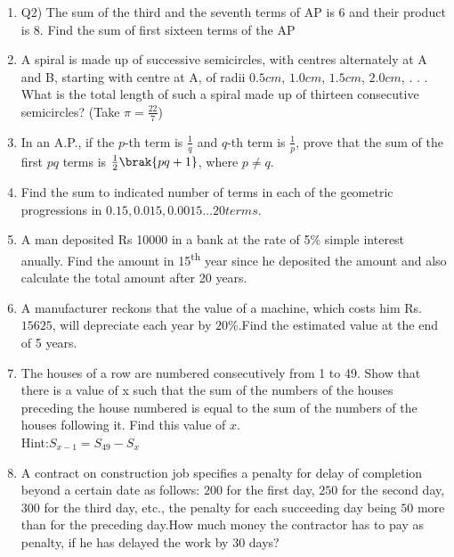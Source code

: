 \begin{enumerate}[label=\thechapter.\arabic*,ref=\thechapter.\theenumi]
\item Q2) The sum of the third and the seventh terms of AP is 6 and their product is 8. Find the sum of first sixteen terms of the AP \\
\solution 
\pagebreak
\item A spiral is made up of successive semicircles, with centres alternately at A and B, starting with centre at A, of radii $0.5 cm$, $1.0 cm$, $1.5 cm$, $2.0 cm$, . . . What is the total length of such a spiral made up of thirteen consecutive semicircles? (Take $\pi = \frac{22}{7}$)\\
\solution

\newpage
\item In an A.P., if the $p$-th term is $\frac{1}{q}$ and $q$-th term is $\frac{1}{p}$, prove that the sum of the first $pq$ terms is $\frac{1}{2}\brak{pq + 1}$, where $p \neq q$.
\solution
\pagebreak

\item Find the sum to indicated number of terms in each of the geometric progressions in
$0.15, 0.015, 0.0015\ldots 20 terms$.\\
\solution

\pagebreak

\item A man deposited Rs 10000 in a bank at the rate of 5\% simple interest anually. Find the amount in 15\textsuperscript{th} year since he deposited the amount and also calculate the total amount after 20 years.\\
\solution

\pagebreak
\item A manufacturer reckons that the value of a machine, which costs him Rs.$15625$, will depreciate each year by $20\%$.Find the estimated value at the end of 5 years.\\
\solution
\pagebreak


\item The houses of a row are numbered consecutively from 1 to 49. Show that there is a value
of x such that the sum of the numbers of the houses preceding the house numbered is equal to the sum of the numbers of the houses following it. Find this value of $x$.\\
Hint:$ S_{x-1}=S_{49}-S_x$\\
\solution

\pagebreak

\item A contract on construction job specifies a penalty for delay of completion beyond a certain date as follows: \rupee $200$ for the first day, \rupee $250$ for the second day, \rupee $300$ for the third day, etc., the penalty for each succeeding day being \rupee $50$ more than for the preceding day.How much money the contractor has to pay as penalty, if he has delayed the work by $30$ days?\\


\end{enumerate}
